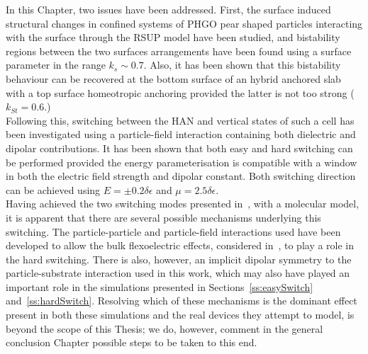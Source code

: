 In this Chapter, two issues have been addressed. First, the surface induced structural changes in
confined systems of PHGO pear shaped particles interacting with the surface through the RSUP
model have been studied, and bistability regions between the two surfaces arrangements have been
found using a surface parameter in the range $k_s \sim 0.7$. Also, it has been shown that 
this bistability behaviour can
be recovered at the bottom surface of an hybrid anchored slab with a top surface homeotropic
anchoring provided the latter is not too strong (\ie $k_{St} = 0.6$.)\\
Following this, switching between the HAN and vertical states of such a cell has been
investigated using a particle-field interaction containing both dielectric and dipolar
contributions. It has been shown that both easy and hard switching can be performed provided the
energy parameterisation is compatible with a window in both the electric field strength and
dipolar constant. Both switching direction can be achieved using $E = \pm 0.2\delta\epsilon$ and
$\mu = 2.5\delta\epsilon$.\\
%
Having achieved the two switching modes presented in~\cite{DavidsonMottram02}, with a molecular
model, it is apparent that there are several possible mechanisms underlying this switching. The
particle-particle and particle-field interactions used have been developed to allow the bulk
flexoelectric effects, considered in~\cite{DavidsonMottram02}, to play a role in the hard
switching. There is also, however, an implicit dipolar symmetry to the particle-substrate
interaction used in this work, which may also have played an important role in the simulations
presented in Sections~\ref{ss:easySwitch} and~\ref{ss:hardSwitch}. Resolving which of these
mechanisms is the dominant effect present in both these simulations and the real devices they
attempt to model, is beyond the scope of this Thesis; we do, however, comment in the general
conclusion Chapter possible steps to be taken to this end.












